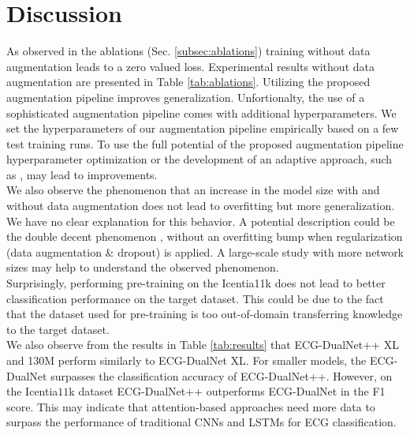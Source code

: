 \section{Discussion} \label{sec:discussion}
As observed in the ablations (Sec. \ref{subsec:ablations}) training without data augmentation leads to a zero valued loss. Experimental results without data augmentation are presented in Table \ref{tab:ablations}. Utilizing the proposed augmentation pipeline improves generalization. Unfortionalty, the use of a sophisticated augmentation pipeline comes with additional hyperparameters. We set the hyperparameters of our augmentation pipeline empirically based on a few test training runs. To use the full potential of the proposed augmentation pipeline hyperparameter optimization \cite{Goodfellow2016, Cubuk2019} or the development of an adaptive approach, such as \cite{Fawzi2016, Karras2020}, may lead to improvements.\\
\indent We also observe the phenomenon that an increase in the model size with and without data augmentation does not lead to overfitting but more generalization. We have no clear explanation for this behavior. A potential description could be the double decent phenomenon \cite{Belkin2019, Nakkiran2020}, without an overfitting bump when regularization (data augmentation \& dropout) is applied. A large-scale study with more network sizes may help to understand the observed phenomenon.\\
\indent Surprisingly, performing pre-training on the Icentia11k does not lead to better classification performance on the target dataset. This could be due to the fact that the dataset used for pre-training is too out-of-domain transferring knowledge to the target dataset.\\
\indent We also observe from the results in Table \ref{tab:results} that ECG-DualNet++ XL and 130M perform similarly to ECG-DualNet XL. For smaller models, the ECG-DualNet surpasses the classification accuracy of ECG-DualNet++. However, on the Icentia$11$k dataset ECG-DualNet++ outperforms  ECG-DualNet in the F1 score. This may indicate that attention-based approaches need more data to surpass the performance of traditional CNNs and LSTMs for ECG classification.